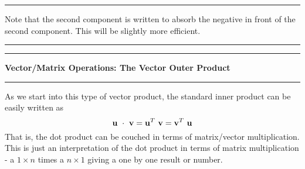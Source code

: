 \documentclass[10pt,fleqn]{article}
\begin{document}
\vskip0.1in\hrule\vskip0.1in
Note that the second component is written to absorb the negative in front of
the second component. This will be slightly more efficient.
\vskip0.1in\hrule\vskip0.1in
\newpage
\vskip0.1in\hrule\vskip0.1in
\noindent
{\bf Vector/Matrix Operations: The Vector Outer Product}
\vskip0.1in\hrule\vskip0.1in
\noindent
As we start into this type of vector product, the standard inner product can be
easily written as
$$
   {\bf u}\ \cdot\ {\bf v} = {\bf u}^T\ {\bf v} = {\bf v}^T\ {\bf u} 
$$
That is, the dot product can be couched in terms of matrix/vector
multiplication. This is just an interpretation of the dot product in terms of
matrix multiplication - a $1\times n$ times a $n\times 1$ giving a one by one
result or number.
\end{document}
